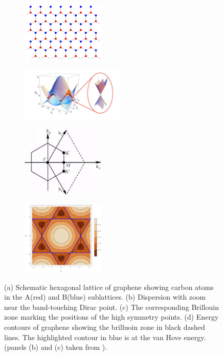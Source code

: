 \begin{figure}[]
	\centering
	\begin{subfigure}{0.5\linewidth}
		\centering
		\includegraphics[width=4cm]{figures/introduction/graphene lattice.png}
            \caption{\centering}
	\end{subfigure}%
        \begin{subfigure}{0.5\linewidth}
		\centering
		\includegraphics[width=5cm]{figures/introduction/bandstructure_graphene.png}
            \caption{\centering}
	\end{subfigure}%
	
 	\centering
	\begin{subfigure}{0.45\linewidth}
		\centering
		\includegraphics[width=4cm]{figures/introduction/brilluoinzonegraphene.png}
            \caption{\centering}
	\end{subfigure}
	\begin{subfigure}{0.45\linewidth}
		\centering
		\includegraphics[width=4cm]{figures/introduction/graphenecontours.pdf}
            \caption{\centering}
	\end{subfigure}

	\caption{(a) Schematic hexagonal lattice of graphene showing carbon atoms in the A(red) and B(blue) sublattices. (b) Dispersion with zoom near the band-touching Dirac point. (c) The corresponding Brillouin zone marking the positions of the high symmetry points. (d) Energy contours of graphene showing the brilluoin zone in black dashed lines. The highlighted contour in blue is at the van Hove energy. (panels (b) and (c) taken from \cite{neto2009electronic}).}
	\label{fig:grapheneschematic}
\end{figure}

